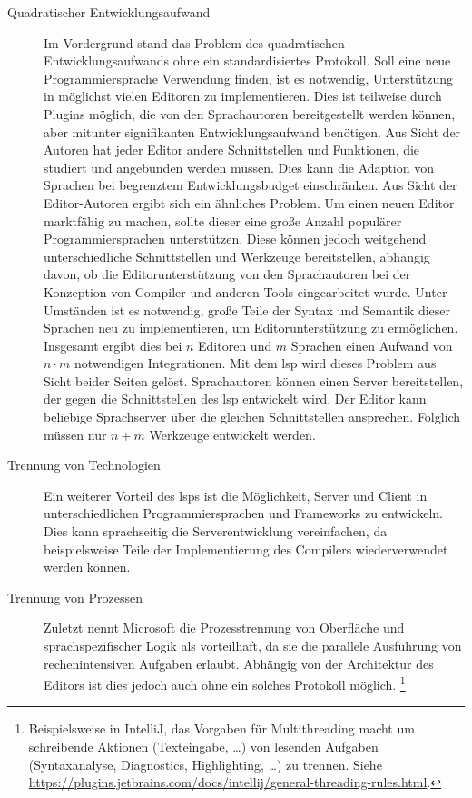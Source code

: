 \begin{description}
    \item[Quadratischer Entwicklungsaufwand]
    Im Vordergrund stand das Problem des quadratischen Entwicklungsaufwands ohne ein standardisiertes Protokoll.
    Soll eine neue Programmiersprache Verwendung finden, ist es notwendig, Unterstützung in möglichst vielen Editoren zu implementieren.
    Dies ist teilweise durch Plugins möglich, die von den Sprachautoren bereitgestellt werden können, aber mitunter signifikanten Entwicklungsaufwand benötigen.
    Aus Sicht der Autoren hat jeder Editor andere Schnittstellen und Funktionen, die studiert und angebunden werden müssen.
    Dies kann die Adaption von Sprachen bei begrenztem Entwicklungsbudget einschränken.
    Aus Sicht der Editor-Autoren ergibt sich ein ähnliches Problem.
    Um einen neuen Editor marktfähig zu machen, sollte dieser eine große Anzahl populärer Programmiersprachen unterstützen.
    Diese können jedoch weitgehend unterschiedliche Schnittstellen und Werkzeuge bereitstellen, abhängig davon, ob die Editorunterstützung von den Sprachautoren bei der Konzeption von Compiler und anderen Tools eingearbeitet wurde.
    Unter Umständen ist es notwendig, große Teile der Syntax und Semantik dieser Sprachen neu zu implementieren, um Editorunterstützung zu ermöglichen.
    Insgesamt ergibt dies bei $n$ Editoren und $m$ Sprachen einen Aufwand von $n \cdot m$ notwendigen Integrationen.
    Mit dem \ac{lsp} wird dieses Problem aus Sicht beider Seiten gelöst.
    Sprachautoren können einen Server bereitstellen, der gegen die Schnittstellen des \ac{lsp} entwickelt wird.
    Der Editor kann beliebige Sprachserver über die gleichen Schnittstellen ansprechen.
    Folglich müssen nur $n + m$ Werkzeuge entwickelt werden.\cite{why-lsp}
    \item[Trennung von Technologien]
    Ein weiterer Vorteil des \acp{lsp} ist die Möglichkeit, Server und Client in unterschiedlichen Programmiersprachen und Frameworks zu entwickeln.
    Dies kann sprachseitig die Serverentwicklung vereinfachen, da beispielsweise Teile der Implementierung des Compilers wiederverwendet werden können.\cite{why-lsp}
    \item[Trennung von Prozessen]
    Zuletzt nennt Microsoft die Prozesstrennung von Oberfläche und sprachspezifischer Logik als vorteilhaft, da sie die parallele Ausführung von rechenintensiven Aufgaben erlaubt.\cite{why-lsp}
    Abhängig von der Architektur des Editors ist dies jedoch auch ohne ein solches Protokoll möglich.
    \footnote{Beispielsweise in IntelliJ, das Vorgaben für Multithreading macht um schreibende Aktionen (Texteingabe, \ldots) von lesenden Aufgaben (Syntaxanalyse, Diagnostics, Highlighting, \ldots) zu trennen. Siehe \url{https://plugins.jetbrains.com/docs/intellij/general-threading-rules.html}.}
\end{description}

